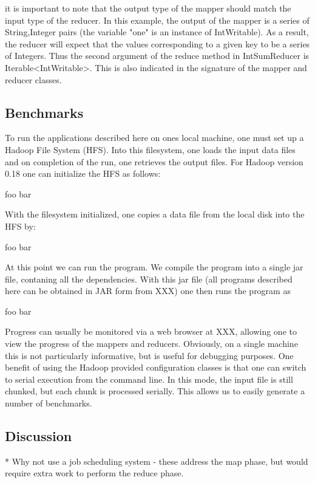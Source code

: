 \documentclass[10pt]{bmc_article}
\newenvironment{bmcformat}{\begin{raggedright}\baselineskip20pt\sloppy\setboolean{publ}{false}}{\end{raggedright}\baselineskip20pt\sloppy}
\begin{document}
\begin{bmcformat}
it is important to note that the output type of the mapper should match the input type of the reducer. In this example, the output of the mapper is a series of String,Integer pairs (the variable "one" is an instance of IntWritable). As a result, the reducer will expect that the values corresponding to a given key to be a series of Integers. Thus the second argument of the reduce method in IntSumReducer is Iterable<IntWritable>. This is also indicated in the signature of the mapper and reducer classes. 

\subsection*{Benchmarks}
\label{sec:benchmarks}

To run the applications described here on ones local machine, one must set up a Hadoop File System (HFS). Into this filesystem, one loads the input data files and on completion of the run, one retrieves the output files. For Hadoop version 0.18 one can initialize the HFS as follows:

foo
bar

With the filesystem initialized, one copies a data file from the local disk into the HFS by:

foo
bar

At this point we can run the program. We compile the program into a single jar file, contaning all the dependencies. With this jar file (all programs described here can be obtained in JAR form from XXX) one then runs the program as

foo
bar

Progress can usually be monitored via a web browser at XXX, allowing one to view the progress of the mappers and reducers. Obviously, on a single machine this is not particularly informative, but is useful for debugging purposes. One benefit of using the Hadoop provided configuration classes is that one can switch to serial execution from the command line. In this mode, the input file is still chunked, but each chunk is processed serially. This allows us to easily generate a number of benchmarks.

\subsection*{Discussion}
\label{sec:discussion}

* Why not use a job scheduling system - these address the map phase,
but would require extra work to perform the reduce phase.


\end{bmcformat}
\end{document}
